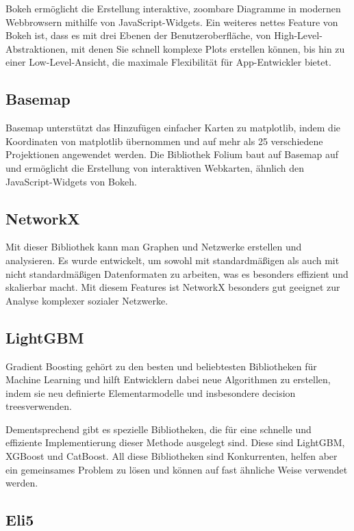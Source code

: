 Bokeh ermöglicht die Erstellung interaktive, zoombare Diagramme in modernen Webbrowsern mithilfe von JavaScript-Widgets. Ein weiteres nettes Feature von Bokeh ist, dass es mit drei Ebenen der Benutzeroberfläche, von High-Level-Abstraktionen, mit denen Sie schnell komplexe Plots erstellen können, bis hin zu einer Low-Level-Ansicht, die maximale Flexibilität für App-Entwickler bietet.

\subsection{Basemap}

Basemap unterstützt das Hinzufügen einfacher Karten zu matplotlib, indem die Koordinaten von matplotlib übernommen und auf mehr als 25 verschiedene Projektionen angewendet werden. Die Bibliothek Folium baut auf Basemap auf und ermöglicht die Erstellung von interaktiven Webkarten, ähnlich den JavaScript-Widgets von Bokeh.

\subsection{NetworkX}

Mit dieser Bibliothek kann man Graphen und Netzwerke erstellen und analysieren. Es wurde entwickelt, um sowohl mit standardmäßigen als auch mit nicht standardmäßigen Datenformaten zu arbeiten, was es besonders effizient und skalierbar macht. Mit diesem Features ist NetworkX besonders gut geeignet zur Analyse komplexer sozialer Netzwerke.

\subsection{LightGBM}

Gradient Boosting gehört zu den besten und beliebtesten Bibliotheken für Machine Learning und hilft Entwicklern dabei neue Algorithmen zu erstellen, indem sie neu definierte Elementarmodelle und insbesondere decision treesverwenden.

Dementsprechend gibt es spezielle Bibliotheken, die für eine schnelle und effiziente Implementierung dieser Methode ausgelegt sind. Diese sind LightGBM, XGBoost und CatBoost. All diese Bibliotheken sind Konkurrenten, helfen aber ein gemeinsames Problem zu lösen und können auf fast ähnliche Weise verwendet werden.

\subsection{Eli5}


